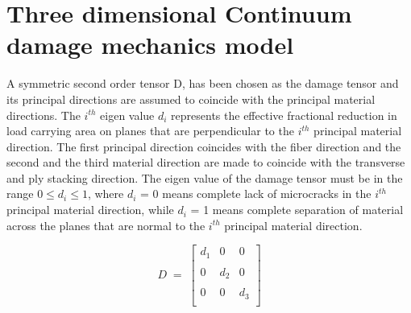 \section{Three dimensional Continuum damage mechanics model}
\indent\indent\indent A symmetric second order tensor D, has been chosen as the damage tensor and its principal directions are assumed to coincide with the principal material directions. The $i^{th}$ eigen value $d_{i}$ represents the effective fractional reduction in load carrying area on planes that are perpendicular to the $i^{th}$ principal material direction. The first principal direction coincides with the fiber direction and the second and the third material direction are made to coincide with the transverse and ply stacking direction. The eigen value of the damage tensor must be in the range $0 \leq d_{i} \leq  1  $, where $d_{i}$ = 0 means complete lack of microcracks in the $i^{th}$ principal material direction, while $d_{i}$ = 1 means complete separation of material across the planes that are normal to the $i^{th}$ principal material direction.

$$
D \; = \; 
 \begin{bmatrix}
  d_{1} & 0 & 0  \\
  \\
  0 & d_{2} & 0  \\
  \\  
  0 & 0 & d_{3} \\
  
 \end{bmatrix}
 $$  
 
